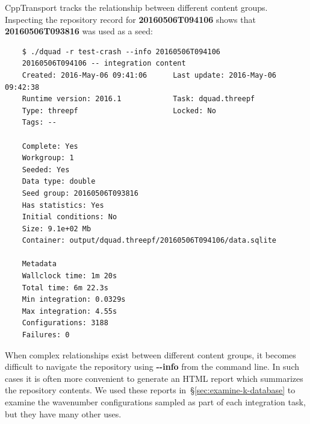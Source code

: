 \documentclass[11pt,a4paper]{article}
\newcommand{\repoobject}[1]{{\ttfamily\bfseries\small #1}}
\newcommand{\packagefont}{\sffamily}
\newcommand{\CppTransport}{{\packagefont CppTransport}}
\newcommand{\option}[1]{{\ttfamily\bfseries\small #1}}
\begin{document}
{\CppTransport} tracks the relationship between different content groups.
Inspecting the repository record for \repoobject{20160506T094106}
shows that \repoobject{20160506T093816} was used as a seed:
\begin{verbatim}
    $ ./dquad -r test-crash --info 20160506T094106
    20160506T094106 -- integration content
    Created: 2016-May-06 09:41:06      Last update: 2016-May-06 09:42:38  
    Runtime version: 2016.1            Task: dquad.threepf                
    Type: threepf                      Locked: No                         
    Tags: --                           
    
    Complete: Yes  
    Workgroup: 1  
    Seeded: Yes  
    Data type: double  
    Seed group: 20160506T093816  
    Has statistics: Yes  
    Initial conditions: No  
    Size: 9.1e+02 Mb  
    Container: output/dquad.threepf/20160506T094106/data.sqlite  
    
    Metadata
    Wallclock time: 1m 20s  
    Total time: 6m 22.3s  
    Min integration: 0.0329s  
    Max integration: 4.55s  
    Configurations: 3188  
    Failures: 0      
\end{verbatim}

When complex relationships exist
between different content groups,
it becomes difficult to navigate the repository
using \option{{-}{-}info} from the command line.
In such cases it is often more convenient to generate an HTML report
which summarizes the repository contents.
We used these reports in~\S\ref{sec:examine-k-database}
to examine the wavenumber configurations
sampled as part of
each integration task, but they have many other uses.
\end{document}
